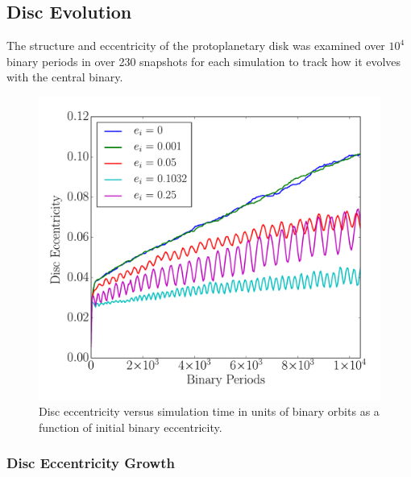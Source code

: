
\subsection{Disc Evolution}

The structure and eccentricity of the protoplanetary disk was examined over $10^4$ binary periods in over 230 snapshots
for each simulation to track how it evolves with the central binary.

\begin{figure}
	\includegraphics[width=\columnwidth]{f2}
    \caption{Disc eccentricity versus simulation time in units of binary orbits as a function of initial binary eccentricity.}
    \label{fig:figure2}
\end{figure}


\subsubsection{Disc Eccentricity Growth} \label{discEccEvolution}

